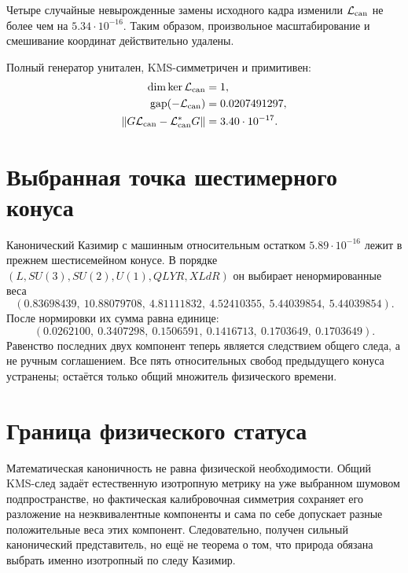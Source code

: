 Четыре случайные невырожденные замены исходного кадра изменили
$\mathcal L_{\rm can}$ не более чем на $5.34\cdot10^{-16}$. Таким образом,
произвольное масштабирование и смешивание координат действительно удалены.

Полный генератор унитален, KMS-симметричен и примитивен:
\begin{align}
 \dim\ker\mathcal L_{\rm can}&=1,\\
 \operatorname{gap}(-\mathcal L_{\rm can})&=0.0207491297,\\
 \|G\mathcal L_{\rm can}-\mathcal L_{\rm can}^*G\|
 &=3.40\cdot10^{-17}.
 \label{eq:v8-canonical-noise-generator-diagnostics}
\end{align}

\section{Выбранная точка шестимерного конуса}

Канонический Казимир с машинным относительным остатком
$5.89\cdot10^{-16}$ лежит в прежнем шестисемейном конусе. В порядке
$(L,SU(3),SU(2),U(1),QLYR,XLdR)$ он выбирает ненормированные веса
\begin{equation}
 (0.83698439,\ 10.88079708,\ 4.81111832,\ 4.52410355,\
 5.44039854,\ 5.44039854).
 \label{eq:v8-canonical-trace-family-weights}
\end{equation}
После нормировки их сумма равна единице:
\begin{equation}
 (0.0262100,\ 0.3407298,\ 0.1506591,\ 0.1416713,\
 0.1703649,\ 0.1703649).
 \label{eq:v8-canonical-trace-normalized-weights}
\end{equation}
Равенство последних двух компонент теперь является следствием общего
следа, а не ручным соглашением. Все пять относительных свобод предыдущего
конуса устранены; остаётся только общий множитель физического времени.

\section{Граница физического статуса}

Математическая каноничность не равна физической необходимости. Общий
KMS-след задаёт естественную изотропную метрику на уже выбранном шумовом
подпространстве, но фактическая калибровочная симметрия сохраняет его
разложение на неэквивалентные компоненты и сама по себе допускает разные
положительные веса этих компонент. Следовательно, получен сильный
канонический представитель, но ещё не теорема о том, что природа обязана
выбрать именно изотропный по следу Казимир.


